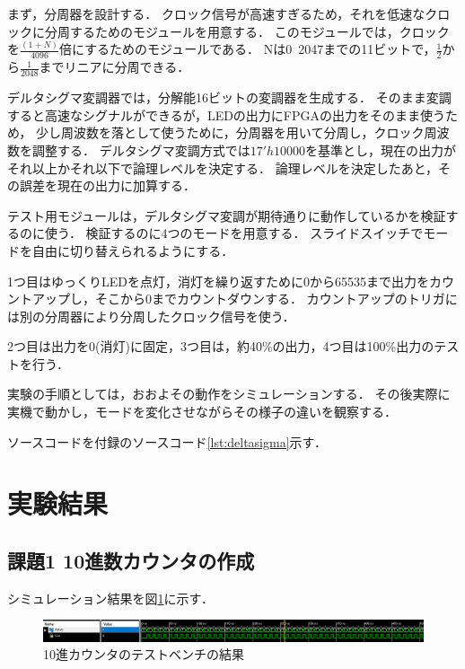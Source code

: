 まず，分周器を設計する．
クロック信号が高速すぎるため，それを低速なクロックに分周するためのモジュールを用意する．
このモジュールでは，クロックを$\frac{(1+N)}{4096}$倍にするためのモジュールである．
Nは0~2047までの11ビットで，$\frac{1}{2}$から$\frac{1}{2048}$までリニアに分周できる．

デルタシグマ変調器では，分解能16ビットの変調器を生成する．
そのまま変調すると高速なシグナルができるが，LEDの出力にFPGAの出力をそのまま使うため，
少し周波数を落として使うために，分周器を用いて分周し，クロック周波数を調整する．
デルタシグマ変調方式では$17'h10000$を基準とし，現在の出力がそれ以上かそれ以下で論理レベルを決定する．
論理レベルを決定したあと，その誤差を現在の出力に加算する．

テスト用モジュールは，デルタシグマ変調が期待通りに動作しているかを検証するのに使う．
検証するのに4つのモードを用意する．
スライドスイッチでモードを自由に切り替えられるようにする．

1つ目はゆっくりLEDを点灯，消灯を繰り返すために0から65535まで出力をカウントアップし，そこから0までカウントダウンする．
カウントアップのトリガには別の分周器により分周したクロック信号を使う．

2つ目は出力を0(消灯)に固定，3つ目は，約40\%の出力，4つ目は100\%出力のテストを行う．

実験の手順としては，おおよその動作をシミュレーションする．
その後実際に実機で動かし，モードを変化させながらその様子の違いを観察する．


ソースコードを付録のソースコード\ref{lst:deltasigma}示す．


\section{実験結果}
\subsection{課題1 10進数カウンタの作成}
シミュレーション結果を図\ref{fig:counter10-testbench}に示す．
\begin{figure}[tbp]
  \includegraphics[angle=0,width=160mm]{week4/pics/counter10.png}
  \centering
  \caption{10進カウンタのテストベンチの結果} %
  \label{fig:counter10-testbench} %
\end{figure}

